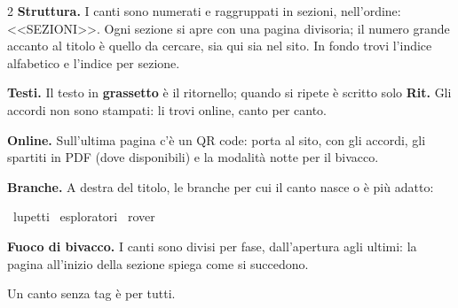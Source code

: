 \begingroup\small
\begin{multicols}{2}
\textbf{Struttura.} I canti sono numerati e raggruppati in sezioni, nell'ordine:
<<SEZIONI>>. Ogni sezione si apre con una pagina divisoria; il numero grande accanto
al titolo è quello da cercare, sia qui sia nel sito. In fondo trovi l'indice alfabetico
e l'indice per sezione.

\medskip
\textbf{Testi.} Il testo in \textbf{grassetto} è il ritornello; quando si ripete
è scritto solo \textbf{Rit.} Gli accordi non sono
stampati: li trovi online, canto per canto.

\medskip
\textbf{Online.} Sull'ultima pagina c'è un QR code: porta al sito, con gli accordi,
gli spartiti in PDF (dove disponibili) e la modalità notte per il bivacco.

\columnbreak
\textbf{Branche.} A destra del titolo, le branche per cui il canto nasce o è
più adatto:

\smallskip
\bLC\ lupetti \quad \bEG\ esploratori \quad \bRS\ rover

\medskip
\textbf{Fuoco di bivacco.} I canti sono divisi per fase, dall'apertura agli ultimi:
la pagina all'inizio della sezione spiega come si succedono.

\medskip
Un canto senza tag è per tutti.
\end{multicols}
\endgroup
